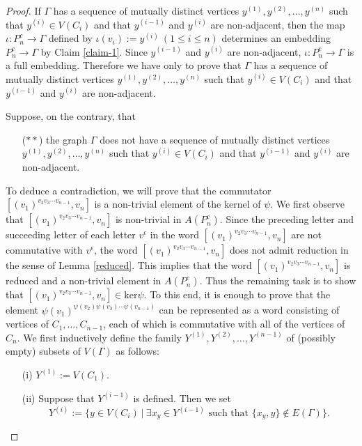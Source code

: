 \documentclass{amsart}
\theoremstyle{definition}
\theoremstyle{plain}
\numberwithin{equation}{section}
\begin{document}
\begin{proof}
If $\Gamma$ has a sequence of mutually distinct vertices $y^{(1)}, y^{(2)}, \ldots, y^{(n)}$ such that $y^{(i)} \in V(C_i)$ and that $y^{(i-1)}$ and $y^{(i)}$ are non-adjacent, then the map $\iota \colon P_n^c \rightarrow \Gamma$ defined by $\iota(v_i):= y^{(i)} \ (1 \leq i \leq n)$ determines an embedding $P_n^c \rightarrow \Gamma$ by Claim \ref{claim-1}. 
Since $y^{(i-1)}$ and $y^{(i)}$ are non-adjacent, $\iota \colon P_n^c \rightarrow \Gamma$ is a full embedding. 
Therefore we have only to prove that $\Gamma$ has a sequence of mutually distinct vertices $y^{(1)}, y^{(2)}, \ldots, y^{(n)}$ such that $y^{(i)} \in V(C_i)$ and that $y^{(i-1)}$ and $y^{(i)}$ are non-adjacent. 

Suppose, on the contrary, that 
\begin{itemize}
 \item[($**$)] the graph $\Gamma$ does not have a sequence of mutually distinct vertices $y^{(1)}, y^{(2)}, \ldots, y^{(n)}$ such that $y^{(i)} \in V(C_i)$ and that $y^{(i-1)}$ and $y^{(i)}$ are non-adjacent. 
\end{itemize} 
To deduce a contradiction, we will prove that the commutator $[(v_1)^{v_2 v_3\cdots v_{n-1}}, v_n]$ is a non-trivial element of the kernel of $\psi$. 
We first observe that $[(v_1)^{v_2 v_3\cdots v_{n-1}}, v_n]$ is non-trivial in $A(P_n^c)$. 
Since the preceding letter and succeeding letter of each letter $v^{\epsilon}$ in the word $[(v_1)^{v_2 v_3\cdots v_{n-1}}, v_n]$ are not commutative with $v^{\epsilon}$, the word $[(v_1)^{v_2 v_3\cdots v_{n-1}}, v_n]$ does not admit reduction in the sense of Lemma \ref{reduced}. 
This implies that the word $[(v_1)^{v_2 v_3\cdots v_{n-1}}, v_n]$ is reduced and a non-trivial element in $A(P_n^c)$. 
Thus the remaining task is to show that $[(v_1)^{v_2 v_3\cdots v_{n-1}}, v_n] \in \mathrm{ker}\psi$. 
To this end, it is enough to prove that the element ${\psi(v_1)}^{\psi(v_2)  \psi(v_3) \cdots \psi(v_{n-1})}$ can be represented as a word consisting of vertices of $C_1, \ldots, C_{n-1}$, each of which is commutative with all of the vertices of $C_n$. 
We first inductively define the family $Y^{(1)}, Y^{(2)}, \ldots, Y^{(n-1)}$ of (possibly empty) subsets of $V(\Gamma)$ as follows: 

\begin{enumerate}
 \item[(i)] $Y^{(1)}:= V(C_1)$. 
 \item[(ii)] Suppose that $Y^{(i-1)}$ is defined. 
 Then we set 
 $$Y^{(i)}:= \{ y \in V(C_i) \ | \ \exists x_y \in Y^{(i-1)} \mbox{ such that } \{ x_y , y \} \not\in E(\Gamma) \}. $$ 
\end{enumerate}


\end{proof}
\end{document}
